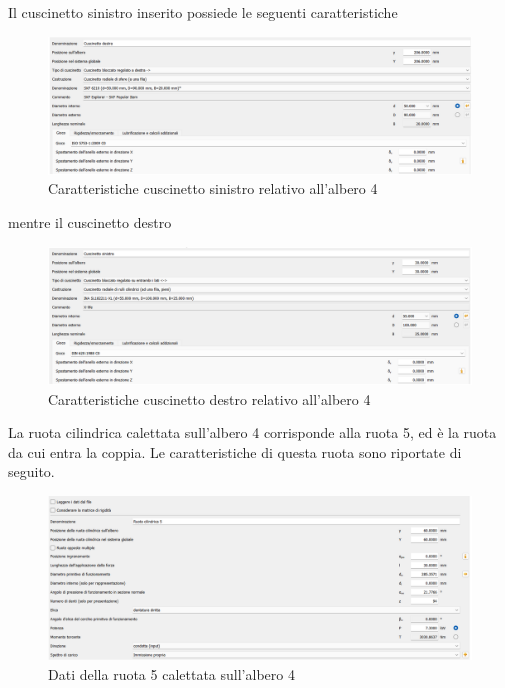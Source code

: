 Il cuscinetto sinistro inserito possiede le seguenti caratteristiche
\begin{figure}[h]
    \centering
    \includegraphics[scale=0.6]{Immagini/CuscinettoSinistraAlbero4.png}
    \caption{Caratteristiche cuscinetto sinistro relativo all'albero 4}
    \label{fig:CuscinettoSinsitraAlbero4}
\end{figure}

mentre il cuscinetto destro
\begin{figure}[h]
    \centering
    \includegraphics[scale=0.6]{Immagini/CuscinettoDestraAlbero4.png}
    \caption{Caratteristiche cuscinetto destro relativo all'albero 4}
    \label{fig:CuscinettoDestraAlbero4}
\end{figure}
\newpage
La ruota cilindrica calettata sull'albero 4 corrisponde alla ruota 5, ed è la ruota da cui entra la coppia. Le caratteristiche di questa ruota sono riportate di seguito.
\begin{figure}[h]
    \centering
    \includegraphics[scale=0.6]{Immagini/Ruota5Albero4.png}
    \caption{Dati della ruota 5 calettata sull'albero 4}
    \label{fig:Ruota5Albero4}
\end{figure}

